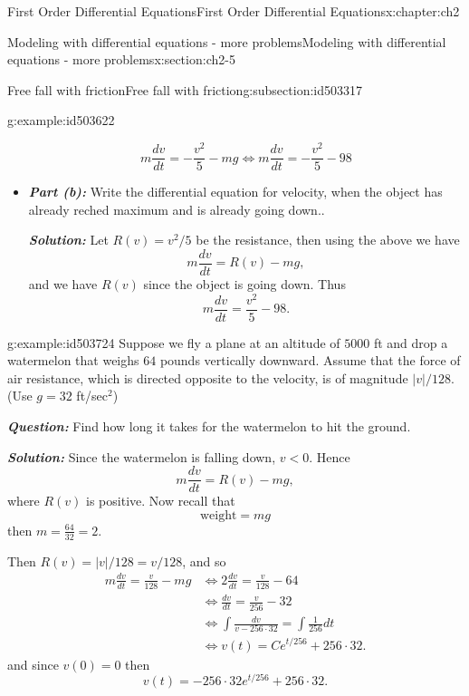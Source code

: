 \documentclass[oneside,10pt,]{book}
\newcommand{\alert}[1]{\textbf{\textit{#1}}}
\numberwithin{equation}{section}
\numberwithin{equation}{section}
\newcommand{\lt}{<}
\newcommand{\amp}{&}
\begin{document}
\begin{chapterptx}{First Order Differential Equations}{}{First Order Differential Equations}{}{}{x:chapter:ch2}
\begin{sectionptx}{Modeling with differential equations - more problems}{}{Modeling with differential equations - more problems}{}{}{x:section:ch2-5}
\begin{subsectionptx}{Free fall with friction}{}{Free fall with friction}{}{}{g:subsection:id503317}
\begin{example}{}{g:example:id503622}
\begin{itemize}[label=\textbullet]
\begin{equation*}
m\frac{dv}{dt}=-\frac{v^{2}}{5}-mg\iff m\frac{dv}{dt}=-\frac{v^{2}}{5}-98
\end{equation*}
%
\item{}\alert{Part (b):} Write the differential equation for velocity, when the object has already reched maximum and is already going down..%
\par
\alert{Solution:} Let \(R(v)=v^{2}/5\) be the resistance, then using the above we have%
\begin{equation*}
m\frac{dv}{dt}=R(v)-mg,
\end{equation*}
and we have \(R(v)\) since the object is going down. Thus%
\begin{equation*}
m\frac{dv}{dt}=\frac{v^{2}}{5}-98.
\end{equation*}
%
\end{itemize}
\end{example}
\begin{example}{}{g:example:id503724}%
Suppose we fly a plane at an altitude of \(5000\) ft and drop a watermelon that weighs \(64\) pounds vertically downward. Assume that the force of air resistance, which is directed opposite to the velocity, is of magnitude \(\left|v\right|/128\). (Use \(g=32\) ft\slash{}sec\(^2\))%
\par
\alert{Question:} Find how long it takes for the watermelon to hit the ground.%
\par
\alert{Solution:} Since the watermelon is falling down, \(v\lt0\). Hence%
\begin{equation*}
m\frac{dv}{dt}=R(v)-mg,
\end{equation*}
where \(R(v)\) is positive. Now recall that%
\begin{equation*}
\text{weight}=mg
\end{equation*}
then \(m=\frac{64}{32}=2\).%
\par
Then \(R(v)=\left|v\right|/128=v/128\), and so%
\begin{align*}
m\frac{dv}{dt}=\frac{v}{128}-mg \amp \iff2\frac{dv}{dt}=\frac{v}{128}-64\\
\amp \iff\frac{dv}{dt}=\frac{v}{256}-32\\
\amp \iff\int\frac{dv}{v-256\cdot32}=\int\frac{1}{256}dt\\
\amp \iff v(t)=Ce^{t/256}+256\cdot32.
\end{align*}
and since \(v(0)=0\) then%
\begin{equation*}
v(t)=-256\cdot32e^{t/256}+256\cdot32.
\end{equation*}

\end{example}
\end{subsectionptx}
\end{sectionptx}
\end{chapterptx}
\end{document}
